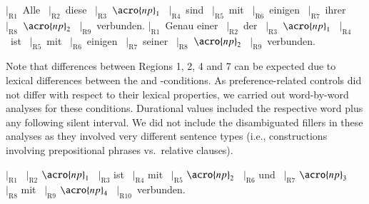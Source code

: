 \documentclass[fleqn,reqno,10pt]{article}
\newcommand{\as}{\acro{as}}
\renewcommand{\es}{\acro{es}}
\begin{document}
\begin{exe}
  \ex
    \begin{xlist}
      \ex $|_{\text{R}1}$~Alle  	\ $|_{\text{R}2}$~diese 
      \ $|_{\text{R}3}$~$\acro{np}_1$  
      \ $|_{\text{R}4}$~sind  \ $|_{\text{R}5}$~mit  \
      $|_{\text{R}6}$~einigen  \ $|_{\text{R}7}$~ihrer 
       \ $|_{\text{R}8}$~{$\acro{np}_2$}  \ $|_{\text{R}9}$~verbunden.
    \ex       $|_{\text{R}1}$~Genau einer  	\ $|_{\text{R}2}$~der 
      \ $|_{\text{R}3}$~$\acro{np}_1$  
      \ $|_{\text{R}4}$~ist  \ $|_{\text{R}5}$~mit  \
      $|_{\text{R}6}$~einigen  \ $|_{\text{R}7}$~seiner 
       \ $|_{\text{R}8}$~{$\acro{np}_2$}  \ $|_{\text{R}9}$~verbunden.
    \end{xlist}
\end{exe}

\noindent Note that differences between Regions 1, 2, 4 and 7 can be expected
due to lexical differences between the \as and \es-conditions. As
preference-related controls did not differ with respect to their lexical
properties, we carried out word-by-word analyses for these
conditions. Durational values included the respective word plus any
following silent interval. We did not include the
disambiguated fillers in these analyses as they involved very
different sentence types (i.e., constructions involving prepositional
phrases vs.~relative clauses).

\begin{exe}
  \ex $|_{\text{R}1}$   	\ $|_{\text{R}2}$ $\acro{np}_1$
      \ $|_{\text{R}3}$ ist 
      \ $|_{\text{R}4}$ mit  \ $|_{\text{R}5}$ $\acro{np}_2$   \
      $|_{\text{R}6}$ und  \ $|_{\text{R}7}$ $\acro{np}_3$ 
       \ $|_{\text{R}8}$  mit  \ $|_{\text{R}9}$ $\acro{np}_4$ \ $|_{\text{R}10}$~verbunden.
\end{exe}
\end{document}
